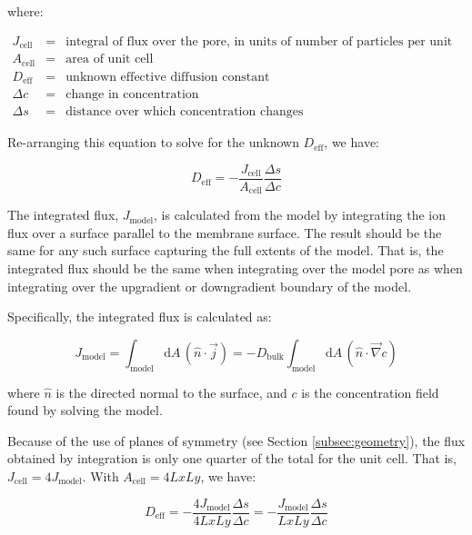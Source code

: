 where:

$\begin{array}{rcl}
J_{\text{cell}} & = & \text{integral of flux over the pore, in units of number of particles per unit time} \\
A_{\text{cell}} & = & \text{area of unit cell} \\
D_{\text{eff}} & = & \text{unknown effective diffusion constant} \\
\Delta c & = & \text{change in concentration} \\
\Delta s & = & \text{distance over which concentration changes}
\end{array}$

Re-arranging this equation to solve for the unknown $D_{\mathrm{eff}}$, we have:

\begin{equation}\label{eq:Deff_def}
D_{\mathrm{eff}} = - \frac{J_{\mathrm{cell}}}{A_{\mathrm{cell}}} \frac{\Delta s}{\Delta c}
\end{equation}

The integrated flux, $J_{\mathrm{model}}$, is calculated from the model by integrating
the ion flux over a surface parallel to the membrane surface.
The result should be the same for any such surface capturing the full extents of the model.
That is, the integrated flux should be the same when integrating over the model pore as
when integrating over the upgradient or downgradient boundary of the model.

Specifically, the integrated flux is calculated as:

\begin{equation}
J_{\mathrm{model}} = \int_{\mathrm{model}} \mathrm{d}A\, \left(\hat{n} \cdot \vec{j} \right)
 = - D_{\mathrm{bulk}} \int_{\mathrm{model}} \mathrm{d}A\, \left(\hat{n} \cdot \vec{\nabla} c \right)
\end{equation}

where $\hat{n}$ is the directed normal to the surface,
and $c$ is the concentration field found by solving the model.

Because of the use of planes of symmetry (see Section \ref{subsec:geometry}),
the flux obtained by integration is only one quarter of the total for the unit cell.
That is, $J_{\mathrm{cell}} = 4 J_{\mathrm{model}}$.
With $A_{\mathrm{cell}} = 4 Lx Ly$, we have:

\begin{equation}
D_{\mathrm{eff}} = - \frac{4 J_{\mathrm{model}}}{4 Lx Ly} \frac{\Delta s}{\Delta c}
 = - \frac{J_{\mathrm{model}}}{Lx Ly} \frac{\Delta s}{\Delta c}
\end{equation}

